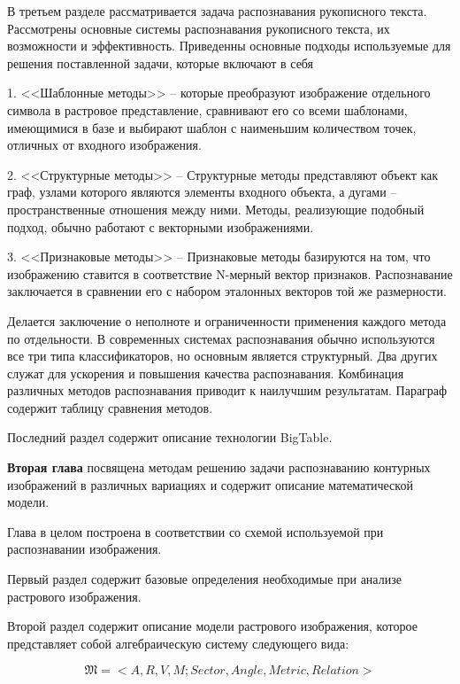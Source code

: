 В третьем разделе рассматривается задача распознавания рукописного текста. Рассмотрены основные системы распознавания рукописного текста, их возможности и эффективность. Приведенны основные подходы используемые для решения поставленной задачи, которые включают в себя 

1.  <<Шаблонные методы>> -- которые преобразуют изображение отдельного символа в растровое представление, сравнивают его со всеми шаблонами, имеющимися в базе и выбирают шаблон с наименьшим количеством точек, отличных от входного изображения.

2. <<Структурные методы>> -- Структурные методы представляют объект как граф, узлами которого являются элементы входного объекта, а дугами – пространственные отношения между ними. Методы, реализующие подобный подход, обычно работают с векторными изображениями.

3. <<Признаковые методы>> -- Признаковые методы базируются на том, что изображению ставится в соответствие N-мерный вектор признаков. Распознавание заключается в сравнении его с набором эталонных векторов той же размерности.


\noindent
Делается заключение о неполноте и ограниченности применения каждого метода по отдельности. В современных системах распознавания обычно используются все три типа классификаторов, но основным является структурный. Два других служат для ускорения и повышения качества распознавания. Комбинация различных методов распознавания приводит к наилучшим результатам. Параграф содержит таблицу сравнения методов.

Последний раздел содержит описание технологии BigTable.

\textbf{Вторая глава} посвящена методам решению  задачи распознаванию контурных изображений в различных вариациях и содержит описание математической модели.

Глава в целом построена в соответствии со схемой используемой при распознавании изображения.
 
Первый раздел содержит базовые определения необходимые при анализе растрового изображения.
 
Второй раздел содержит описание модели растрового изображения, которое представляет собой алгебраическую систему следующего вида:

\begin{equation}
\mathfrak{M} = < A, R, V, M; Sector, Angle, Metric, Relation >
\label{eq:model}
\end{equation}


